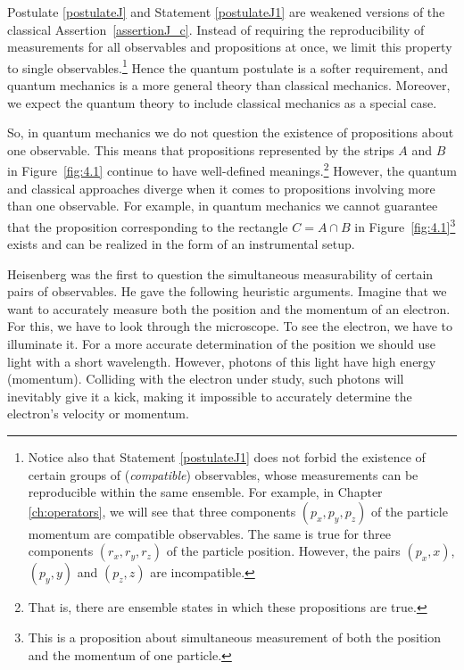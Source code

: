\documentclass[nochecklpage]{stefan1}
\theoremstyle{definition}
\begin{document}
Postulate \ref{postulateJ} and Statement \ref{postulateJ1} are weakened
versions of the classical Assertion~\ref{assertionJ_c}. Instead of
requiring the reproducibility of measurements for all observables and
propositions at once, we limit this property to single
observables.\footnote{Notice also that Statement \ref{postulateJ1}
does not forbid the existence of certain groups of (\emph{compatible})
observables, whose measurements can be
reproducible within the same ensemble. For example, in Chapter
\ref{ch:operators}, we will see that three components $ (p_{x}, p_{y},
p_{z}) $ of the particle momentum are compatible observables. The same
is true for three components $ (r_{x}, r_{y}, r_{z}) $ of the particle
position. However, the pairs $ (p_{x}, x) $, $ (p_{y}, y) $ and
$ (p_{z}, z) $ are incompatible.} Hence the quantum postulate is a
softer requirement, and quantum mechanics is a more general theory than
classical mechanics. Moreover, we expect the quantum theory to include
classical mechanics as a special case.

So, in quantum mechanics we do not question the existence of
propositions about one observable. This means that propositions
represented by the strips $ A $ and $ B $ in Figure~\ref{fig:4.1} continue
to have well-defined meanings.\footnote{That is, there are ensemble
states in which these propositions are true.} However, the quantum and
classical approaches diverge when it comes to propositions involving
more than one observable. For example, in quantum mechanics we cannot
guarantee that the proposition corresponding to the rectangle
$ C = A \cap B $ in Figure~\ref{fig:4.1}\footnote{This is a proposition
about simultaneous measurement of both the position and the momentum of
one particle.} exists and can be realized in the form of an instrumental
setup.

Heisenberg was the first to question the simultaneous measurability of
certain pairs of observables. He gave the following heuristic arguments.
Imagine that we want to accurately measure both the position and the
momentum of an electron. For this, we have to look through the
microscope. To see the electron, we have
to illuminate it. For a more accurate determination of the position we
should use light with a short wavelength. However, photons of this light
have high energy (momentum). Colliding with the electron under study,
such photons will inevitably give it a kick, making it
impossible to accurately determine the electron's velocity or momentum.
\end{document}
